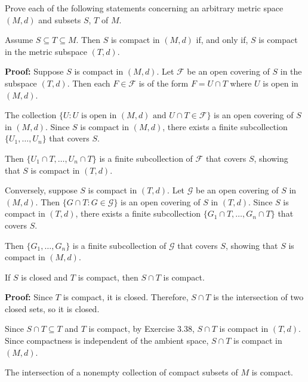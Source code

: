 Prove each of the following statements concerning an arbitrary metric space $(M,d)$ and subsets $S$, $T$ of $M$.

\begin{problembox}
Assume \( S \subseteq T \subseteq M \). Then \( S \) is compact in \((M, d)\) if, and only if, \( S \) is compact in the metric subspace \((T, d)\).
\end{problembox}

\textbf{Proof:} Suppose $S$ is compact in $(M,d)$. Let $\mathcal{F}$ be an open covering of $S$ in the subspace $(T,d)$. Then each $F \in \mathcal{F}$ is of the form $F = U \cap T$ where $U$ is open in $(M,d)$.

The collection $\{U : U \text{ is open in } (M,d) \text{ and } U \cap T \in \mathcal{F}\}$ is an open covering of $S$ in $(M,d)$. Since $S$ is compact in $(M,d)$, there exists a finite subcollection $\{U_1, \ldots, U_n\}$ that covers $S$.

Then $\{U_1 \cap T, \ldots, U_n \cap T\}$ is a finite subcollection of $\mathcal{F}$ that covers $S$, showing that $S$ is compact in $(T,d)$.

Conversely, suppose $S$ is compact in $(T,d)$. Let $\mathcal{G}$ be an open covering of $S$ in $(M,d)$. Then $\{G \cap T : G \in \mathcal{G}\}$ is an open covering of $S$ in $(T,d)$. Since $S$ is compact in $(T,d)$, there exists a finite subcollection $\{G_1 \cap T, \ldots, G_n \cap T\}$ that covers $S$.

Then $\{G_1, \ldots, G_n\}$ is a finite subcollection of $\mathcal{G}$ that covers $S$, showing that $S$ is compact in $(M,d)$.

\begin{problembox}
If \( S \) is closed and \( T \) is compact, then \( S \cap T \) is compact.
\end{problembox}

\textbf{Proof:} Since $T$ is compact, it is closed. Therefore, $S \cap T$ is the intersection of two closed sets, so it is closed.

Since $S \cap T \subseteq T$ and $T$ is compact, by Exercise 3.38, $S \cap T$ is compact in $(T,d)$. Since compactness is independent of the ambient space, $S \cap T$ is compact in $(M,d)$.

\begin{problembox}
The intersection of a nonempty collection of compact subsets of \( M \) is compact.
\end{problembox}


